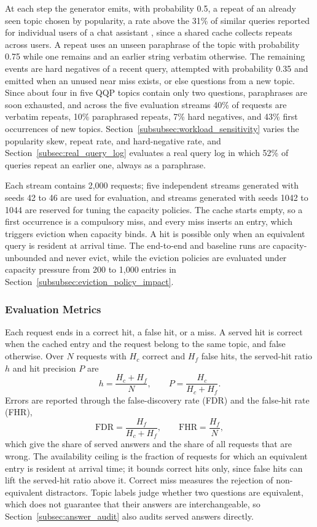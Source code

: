 \documentclass[authoryear,preprint,review,12pt]{elsarticle}
\begin{document}
At each step the generator emits, with probability 0.5, a repeat of an already seen topic chosen by popularity, a rate above the 31\% of similar queries reported for individual users of a chat assistant \citep{gill2024meancache}, since a shared cache collects repeats across users. A repeat uses an unseen paraphrase of the topic with probability 0.75 while one remains and an earlier string verbatim otherwise. The remaining events are hard negatives of a recent query, attempted with probability 0.35 and emitted when an unused near miss exists, or else questions from a new topic. Since about four in five QQP topics contain only two questions, paraphrases are soon exhausted, and across the five evaluation streams 40\% of requests are verbatim repeats, 10\% paraphrased repeats, 7\% hard negatives, and 43\% first occurrences of new topics. Section~\ref{subsubsec:workload_sensitivity} varies the popularity skew, repeat rate, and hard-negative rate, and Section~\ref{subsec:real_query_log} evaluates a real query log in which 52\% of queries repeat an earlier one, always as a paraphrase.

Each stream contains 2,000 requests; five independent streams generated with seeds 42 to 46 are used for evaluation, and streams generated with seeds 1042 to 1044 are reserved for tuning the capacity policies. The cache starts empty, so a first occurrence is a compulsory miss, and every miss inserts an entry, which triggers eviction when capacity binds. A hit is possible only when an equivalent query is resident at arrival time. The end-to-end and baseline runs are capacity-unbounded and never evict, while the eviction policies are evaluated under capacity pressure from 200 to 1,000 entries in Section~\ref{subsubsec:eviction_policy_impact}.

\subsubsection{Evaluation Metrics}
Each request ends in a correct hit, a false hit, or a miss. A served hit is correct when the cached entry and the request belong to the same topic, and false otherwise. Over $N$ requests with $H_c$ correct and $H_f$ false hits, the served-hit ratio $h$ and hit precision $P$ are
\begin{equation}
h=\frac{H_c+H_f}{N},\qquad P=\frac{H_c}{H_c+H_f}.
\label{eq:hit_precision}
\end{equation}
Errors are reported through the false-discovery rate (FDR) and the false-hit rate (FHR),
\begin{equation}
\mathrm{FDR}=\frac{H_f}{H_c+H_f},\qquad \mathrm{FHR}=\frac{H_f}{N},
\label{eq:false_rates}
\end{equation}
which give the share of served answers and the share of all requests that are wrong. The availability ceiling is the fraction of requests for which an equivalent entry is resident at arrival time; it bounds correct hits only, since false hits can lift the served-hit ratio above it. Correct miss measures the rejection of non-equivalent distractors. Topic labels judge whether two questions are equivalent, which does not guarantee that their answers are interchangeable, so Section~\ref{subsec:answer_audit} also audits served answers directly.
\end{document}
